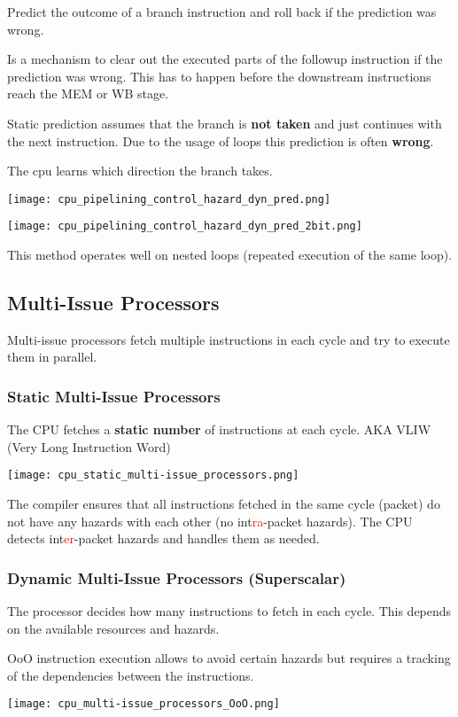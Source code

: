 \begin{multicols*}{3}
    Predict the outcome of a branch instruction and roll back if the prediction was wrong.

    \newpar{}

    Is a mechanism to clear out the executed parts of the followup instruction if the prediction was wrong. This has to happen before the downstream instructions reach the MEM or WB stage.

    \newpar{}

    Static prediction assumes that the branch is \textbf{not taken} and just continues with the next instruction. Due to the usage of loops this prediction is often \textbf{wrong}.

    \newpar{}

    The cpu learns which direction the branch takes.

    \texttt{[image: cpu\_pipelining\_control\_hazard\_dyn\_pred.png]}

    \newpar{}

    \texttt{[image: cpu\_pipelining\_control\_hazard\_dyn\_pred\_2bit.png]}

    This method operates well on nested loops (repeated execution of the same loop).

    \subsection{Multi-Issue Processors}\label{multi-issue processors}
    Multi-issue processors fetch multiple instructions in each cycle and try to execute them in parallel.

    \subsubsection{Static Multi-Issue Processors}
    The CPU fetches a \textbf{static number} of instructions at each cycle. AKA VLIW (Very Long Instruction Word)

    \texttt{[image: cpu\_static\_multi-issue\_processors.png]}

    The compiler ensures that all instructions fetched in the same cycle (packet) do not have any hazards with each other (no int\textcolor{red}{ra}-packet hazards). The CPU detects int\textcolor{red}{er}-packet hazards and handles them as needed. 

    \subsubsection{Dynamic Multi-Issue Processors (Superscalar)}
    The processor decides how many instructions to fetch in each cycle. This depends on the available resources and hazards. 
    \newpar{}

    OoO instruction execution allows to avoid certain hazards but requires a tracking of the dependencies between the instructions.

    \texttt{[image: cpu\_multi-issue\_processors\_OoO.png]}

\end{multicols*}
